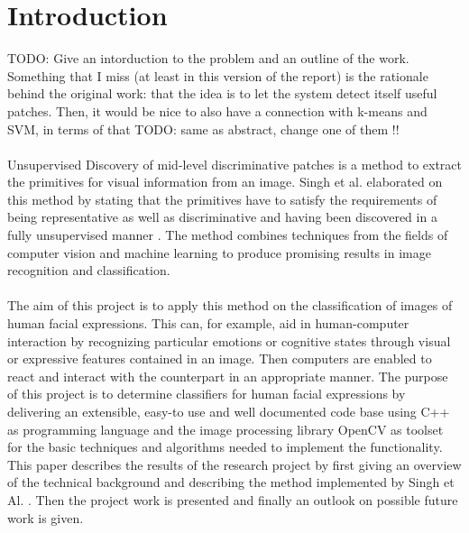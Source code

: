 
\section{Introduction}\label{sec:Introduction}

TODO: Give an intorduction to the problem and an outline of the work. Something that I miss (at least in this version of the report) is the rationale behind the original work: that the idea is to let the system detect itself useful patches. Then, it would be nice to also have a connection with k-means and SVM, in terms of that
TODO: same as abstract, change one of them !!
\\
\\
Unsupervised Discovery of mid-level discriminative patches is a method to extract the primitives for visual information from an image.  Singh et al. elaborated on this method by stating that the primitives have to satisfy the requirements of being representative as well as discriminative and having been discovered in a fully unsupervised manner \cite{Singh2012DiscPat}. The method combines techniques from the fields of computer vision and machine learning to produce promising results in image recognition and classification. 
\\
\\
The aim of this project is to apply this method on the classification of images of human facial expressions. This can, for example, aid in human-computer interaction by recognizing particular emotions or cognitive states through visual or expressive features contained in an image. Then computers are enabled to react and interact with the counterpart in an appropriate manner. The purpose of this project is to determine classifiers for human facial expressions by delivering an extensible, easy-to use and well documented code base using C++ as programming language and the image processing library OpenCV as toolset for the basic techniques and algorithms needed to implement the functionality. This paper describes the results of the research project by first giving an overview of the technical background and describing the method implemented by Singh et Al. \cite{Singh2012DiscPat}. Then the project work is presented and finally an outlook on possible future work is given.